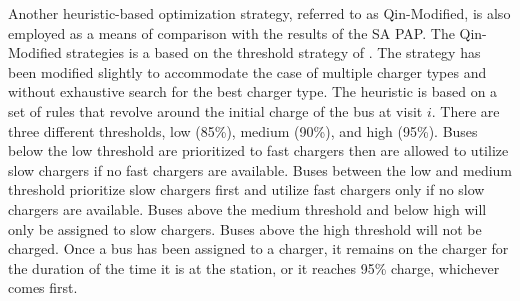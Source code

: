 \documentclass[11pt,a4paper,final]{article}
\begin{document}
Another heuristic-based optimization strategy, referred to as Qin-Modified, is also employed as a means of comparison
with the results of the SA PAP. The Qin-Modified strategies is a based on the threshold strategy of
\cite{qin-2016-numer-analy}. The strategy has been modified slightly to accommodate the case of multiple charger types
and without exhaustive search for the best charger type. The heuristic is based on a set of rules that revolve around
the initial charge of the bus at visit \(i\). There are three different thresholds, low (85\%), medium (90\%), and high
(95\%). Buses below the low threshold are prioritized to fast chargers then are allowed to utilize slow chargers if no
fast chargers are available. Buses between the low and medium threshold prioritize slow chargers first and utilize fast
chargers only if no slow chargers are available. Buses above the medium threshold and below high will only be assigned
to slow chargers. Buses above the high threshold will not be charged. Once a bus has been assigned to a charger, it
remains on the charger for the duration of the time it is at the station, or it reaches 95\% charge, whichever comes
first.
\end{document}
